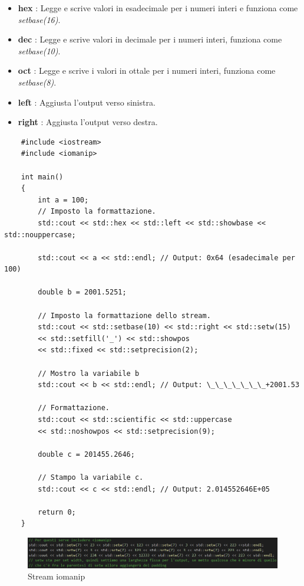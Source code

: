 \begin{enumerate}
\begin{itemize}
			\item \textsf{\small \textbf{hex} : Legge e scrive valori in esadecimale per i numeri interi e funziona come \emph{setbase(16)}.}
			\item \textsf{\small \textbf{dec} : Legge e scrive valori in decimale per i numeri interi, funziona come \emph{setbase(10)}.}
			\item \textsf{\small \textbf{oct} : Legge e scrive i valori in ottale per i numeri interi, funziona come \emph{setbase(8)}.}
			\item \textsf{\small \textbf{left} : Aggiusta l'output verso sinistra.}
			\item \textsf{\small \textbf{right} : Aggiusta l'output verso destra.}
		\end{itemize}
\end{enumerate}

\begin{lstlisting}
	#include <iostream>
	#include <iomanip>
	
	int main()
	{
		int a = 100;
		// Imposto la formattazione.
		std::cout << std::hex << std::left << std::showbase << std::nouppercase;
		
		std::cout << a << std::endl; // Output: 0x64 (esadecimale per 100)
		
		double b = 2001.5251;
		
		// Imposto la formattazione dello stream.
		std::cout << std::setbase(10) << std::right << std::setw(15)
		<< std::setfill('_') << std::showpos
		<< std::fixed << std::setprecision(2);
		
		// Mostro la variabile b
		std::cout << b << std::endl; // Output: \_\_\_\_\_\_\_+2001.53
		
		// Formattazione.
		std::cout << std::scientific << std::uppercase
		<< std::noshowpos << std::setprecision(9);
		
		double c = 201455.2646;
		
		// Stampo la variabile c.
		std::cout << c << std::endl; // Output: 2.014552646E+05
		
		return 0;
	}
\end{lstlisting}

\begin{figure}[ht]
	\centering
	\includegraphics[width=1.2\textwidth, height=1.2\textheight, keepaspectratio]{./imgs/Stream_iomanip_setw.png}
	\caption{Stream iomanip}
	\label{fig:Stream_iomanip_setw}
\end{figure}

